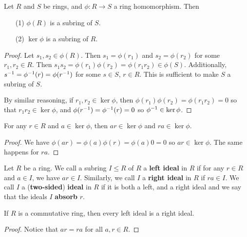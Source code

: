 \begin{lemma}\label{1.3.1}
    Let $R$ and $S$ be rings, and $\phi:R \xrightarrow{} S$ a ring homomorphism.
    Then
    \begin{enumerate}
        \item[(1)] $\phi(R)$ is a subring of $S$.

        \item[(2)] $\ker{\phi}$ is a subring of $R$.
    \end{enumerate}
\end{lemma}
\begin{proof}
    Let $s_1,s_2 \in \phi(R)$. Then $s_1=\phi(r_1)$ and $s_2=\phi(r_2)$ for some
    $r_1,r_2 \in R$. Then $s_1s_2=\phi(r_1)\phi(r_2)=\phi(r_1r_2) \in \phi(S)$.
    Additionally, $s^{-1}=\phi^{-1}(r)=\phi(r^{-1})$ for some $s \in S$,  $r
    \in R$. This is sufficient to make  $S$ a subring of  $S$.

    By similar reasoning, if $r_1,r_2 \in \ker{\phi}$, then
    $\phi(r_1)\phi(r_2)=\phi(r_1r_2)=0$ so that $r_1r_2 \in \ker{\phi}$, and
    $\phi(r^{-1})=\phi^{-1}(r)=0$ so $\phi^{-1}\in \ker{\phi}$.
\end{proof}
\begin{corollary}
    For any $r \in R$ and  $a \in \ker{\phi}$, then $ar \in \ker{\phi}$ and $ra
    \in \ker{\phi}$.
\end{corollary}
\begin{proof}
    We have $\phi(ar)=\phi(a)\phi(r)=\phi(a)0=0$ so $ar \in \ker{\phi}$. The
    same happens for $ra$.
\end{proof}

\begin{definition}
    Let $R$ be a ring. We call a subring $I \leq R$ of $R$ a \textbf{left
    ideal} in $R$ if for any $r \in R$ and $a \in I$, we have  $ar \in I$.
    Similarly, we call  $I$ a  \textbf{right ideal} in $R$ if  $ra \in I$. We
    call  $I$ a  (\textbf{two-sided}) \textbf{ideal} in $R$ if it is both a
    left, and a right ideal and we say that the ideals $I$ \textbf{absorb} $r$.
\end{definition}

\begin{lemma}\label{1.3.2}
    If $R$ is a commutative ring, then every left ideal is a right ideal.
\end{lemma}
\begin{proof}
    Notice that $ar=ra$ for all  $a,r \in R$.
\end{proof}

